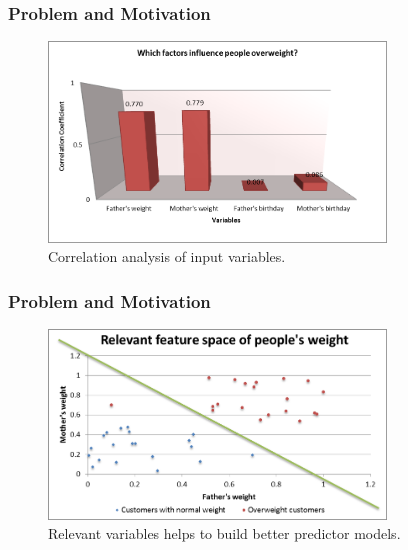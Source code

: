 \begin{frame}
\frametitle{Problem and Motivation}
\begin{Example}
\pause
\begin{figure}[h]
	\centering
		\includegraphics[width=0.8\textwidth]{../Images/example01}       
	\caption{Correlation analysis of input variables.}
	\label{fig:example01}
\end{figure}
\end{Example}
\end{frame}

\begin{frame}
\frametitle{Problem and Motivation}
\begin{Example}
\begin{figure}[h]
	\centering
		\includegraphics[width=0.8\textwidth]{../Images/example02}        
	\caption{Relevant variables helps to build better predictor models.}
	\label{fig:example01}
\end{figure}
\end{Example}
\end{frame}

